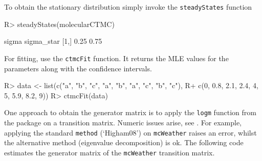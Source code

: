 \documentclass[
  nojss]{jss}
\begin{document}
To obtain the stationary distribution simply invoke the \texttt{steadyStates} function

\begin{CodeChunk}

\begin{CodeInput}
R> steadyStates(molecularCTMC)
\end{CodeInput}

\begin{CodeOutput}
     sigma sigma_star
[1,]  0.25       0.75
\end{CodeOutput}
\end{CodeChunk}

For fitting, use the \texttt{ctmcFit} function. It returns the MLE values for the parameters along with the confidence intervals.

\begin{CodeChunk}

\begin{CodeInput}
R> data <- list(c("a", "b", "c", "a", "b", "a", "c", "b", "c"), 
R+              c(0, 0.8, 2.1, 2.4, 4, 5, 5.9, 8.2, 9))
R> ctmcFit(data)
\end{CodeInput}

\end{CodeChunk}

One approach to obtain the generator matrix is to apply the \texttt{logm} function from the  package on a transition matrix. Numeric issues arise, see \cite{israel2001finding}. For example, applying the standard \texttt{method} (`Higham08') on \texttt{mcWeather} raises an error, whilst the alternative method (eigenvalue decomposition) is ok. The following code estimates the generator matrix of the \texttt{mcWeather} transition matrix.
\end{document}
